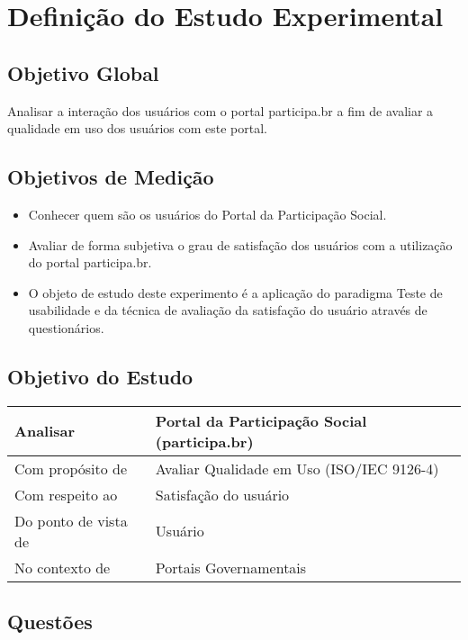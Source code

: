 \section{Definição do Estudo Experimental}

\subsection{Objetivo Global}

	Analisar a interação dos usuários com o portal participa.br a fim de avaliar a qualidade em uso dos usuários com este portal. 

\subsection{Objetivos de Medição}

\begin{itemize}
\item Conhecer quem são os usuários do Portal da Participação Social.
\item Avaliar de forma subjetiva o grau de satisfação dos usuários com a utilização do portal participa.br. 
\item O objeto de estudo deste experimento é a aplicação do paradigma Teste de usabilidade e da técnica de avaliação da satisfação do usuário através de questionários.
\end{itemize}

\subsection{Objetivo do Estudo}


\begin{table}[h]
\begin{tabular}{|l|l|}
\hline
Analisar             & Portal da Participação Social (participa.br) \\ \hline
Com propósito de     & Avaliar Qualidade em Uso (ISO/IEC 9126-4)    \\ \hline
Com respeito ao      & Satisfação do usuário                        \\ \hline
Do ponto de vista de & Usuário                                      \\ \hline
No contexto de       & Portais Governamentais                       \\ \hline
\end{tabular}
\end{table}

\subsection{Questões}

